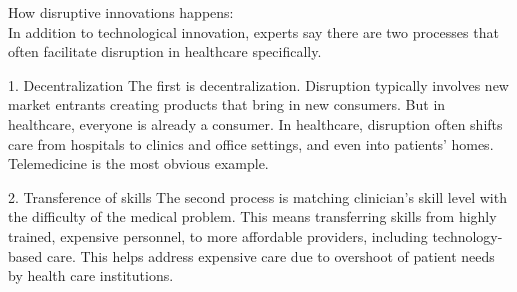 \documentclass[12pt]{article}
\begin{document}
\indent
How disruptive innovations happens:
\\
In addition to technological innovation, experts say there are two processes that often facilitate disruption in healthcare specifically.

1. Decentralization
The first is decentralization. Disruption typically involves new market entrants creating products that bring in new consumers. But in healthcare, everyone is already a consumer. In healthcare, disruption often shifts care from hospitals to clinics and office settings, and even into patients’ homes. Telemedicine is the most obvious example.

2. Transference of skills
The second process is matching clinician’s skill level with the difficulty of the medical problem. This means transferring skills from highly trained, expensive personnel, to more affordable providers, including technology-based care. This helps address expensive care due to overshoot of patient needs by health care institutions.

\indent
\end{document}
